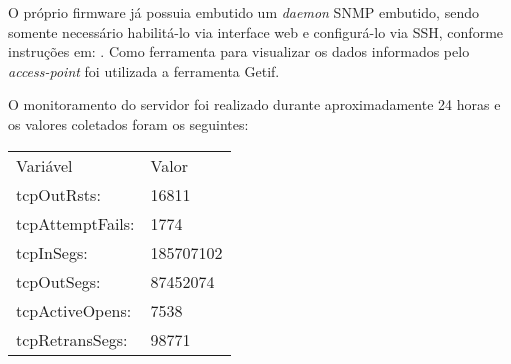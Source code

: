 \documentclass[brazil,times,12pt]{abnt}
\begin{document}
O próprio firmware já possuia embutido um \emph{daemon} SNMP embutido, sendo
somente necessário habilitá-lo via interface web e configurá-lo via SSH,
conforme instruções em: \cite{ddwrt:snmp}. Como ferramenta para visualizar os
dados informados pelo \emph{access-point} foi utilizada a ferramenta Getif.

O monitoramento do servidor foi realizado durante aproximadamente 24 horas e os
valores coletados foram os seguintes:

\begin{center}
\begin{tabular}{ll}
Variável & Valor \\ 
tcpOutRsts:  & 16811 \\
tcpAttemptFails:  & 1774 \\ 
tcpInSegs:  & 185707102 \\ 
tcpOutSegs:  & 87452074 \\
tcpActiveOpens:  & 7538 \\  
tcpRetransSegs:  & 98771 
\end{tabular}
\end{center}



\end{document}
